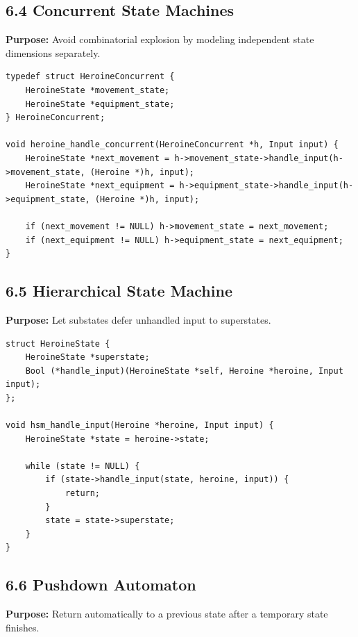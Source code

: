 \documentclass[10pt,letterpaper]{article}
\begin{document}
\subsection{6.4 Concurrent State Machines}

\textbf{Purpose:} Avoid combinatorial explosion by modeling independent state dimensions separately.

\begin{verbatim}
typedef struct HeroineConcurrent {
    HeroineState *movement_state;
    HeroineState *equipment_state;
} HeroineConcurrent;

void heroine_handle_concurrent(HeroineConcurrent *h, Input input) {
    HeroineState *next_movement = h->movement_state->handle_input(h->movement_state, (Heroine *)h, input);
    HeroineState *next_equipment = h->equipment_state->handle_input(h->equipment_state, (Heroine *)h, input);

    if (next_movement != NULL) h->movement_state = next_movement;
    if (next_equipment != NULL) h->equipment_state = next_equipment;
}
\end{verbatim}

\subsection{6.5 Hierarchical State Machine}

\textbf{Purpose:} Let substates defer unhandled input to superstates.

\begin{verbatim}
struct HeroineState {
    HeroineState *superstate;
    Bool (*handle_input)(HeroineState *self, Heroine *heroine, Input input);
};

void hsm_handle_input(Heroine *heroine, Input input) {
    HeroineState *state = heroine->state;

    while (state != NULL) {
        if (state->handle_input(state, heroine, input)) {
            return;
        }
        state = state->superstate;
    }
}
\end{verbatim}

\subsection{6.6 Pushdown Automaton}

\textbf{Purpose:} Return automatically to a previous state after a temporary state finishes.
\end{document}
